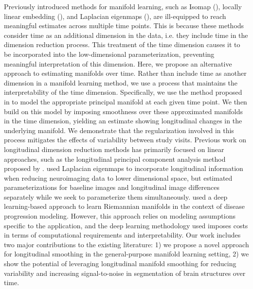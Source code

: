 \documentclass[11pt,reqno]{article}
\theoremstyle{definition}
\begin{document}
Previously introduced methods for manifold learning, such as Isomap (\cite{tenenbaumGlobalGeometricFramework2000}), locally linear embedding (\cite{roweisNonlinearDimensionalityReduction2000}), and Laplacian eigenmaps (\cite{belkin2003laplacian}), are ill-equipped to reach meaningful estimates across multiple time points. This is because these methods consider time as an additional dimension in the data, i.e. they include time in the dimension reduction process. This treatment of the time dimension causes it to be incorporated into the low-dimensional parameterization, preventing meaningful interpretation of this dimension. Here, we propose an alternative approach to estimating manifolds over time. Rather than include time as another dimension in a manifold learning method, we use a process that maintains the interpretability of the time dimension. Specifically, we use the method proposed in \cite{mengPrincipalManifoldEstimation2021} to model the appropriate principal manifold at each given time point. We then build on this model by imposing smoothness over these approximated manifolds in the time dimension, yielding an estimate showing longitudinal changes in the underlying manifold. We demonstrate that the regularization involved in this process mitigates the effects of variability between study visits. Previous work on longitudinal dimension reduction methods has primarily focused on linear approaches, such as the longitudinal principal component analysis method proposed by \cite{kinsonLongitudinalPrincipalComponent2020}. \cite{wolzManifoldLearningBiomarker2010a} used Laplacian eigenmaps to incorporate longitudinal information when reducing neuroimaging data to lower dimensional space, but estimated parameterizations for baseline images and longitudinal image differences separately while we seek to parameterize them simultaneously. \cite{louisRiemannianGeometryLearning2019} used a deep learning-based approach to learn Riemannian manifolds in the context of disease progression modeling. However, this approach relies on modeling assumptions specific to the application, and the deep learning methodology used imposes costs in terms of computational requirements and interpretability. Our work includes two major contributions to the existing literature: 1) we propose a novel approach for longitudinal smoothing in the general-purpose manifold learning setting, 2) we show the potential of leveraging longitudinal manifold smoothing for reducing variability and increasing signal-to-noise in segmentation of brain structures over time.
\end{document}
